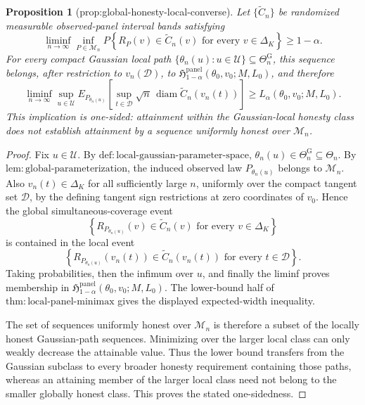 \documentclass{article}
\newtheorem{proposition}{Proposition}
\begin{document}
\begin{proposition}[prop:global-honesty-local-converse]\label{prop:global-honesty-local-converse}
Let \(\{\widetilde C_n\}\) be randomized measurable observed-panel interval bands satisfying
\[
\liminf_{n\to\infty}\inf_{P\in\mathcal M_n}
P\!\left\{
R_P(v)\in\widetilde C_n(v)
\text{ for every }v\in\Delta_K
\right\}
\ge1-\alpha.
\]
For every compact Gaussian local path
\(\{\theta_n(u):u\in\mathcal U\}\subseteq\Theta_n^{\mathrm G}\), this sequence belongs, after restriction to \(v_n(\mathcal D)\), to
\(\mathfrak H^{\mathrm{panel}}_{1-\alpha}(\theta_0,v_0;M,L_0)\), and therefore
\[
\liminf_{n\to\infty}\sup_{u\in\mathcal U}
E_{P_{\theta_n(u)}}\!\left[
\sup_{t\in\mathcal D}\sqrt n\,
\operatorname{diam}\widetilde C_n(v_n(t))
\right]
\ge L_\alpha(\theta_0,v_0;M,L_0).
\]
This implication is one-sided: attainment within the Gaussian-local honesty class does not establish attainment by a sequence uniformly honest over \(\mathcal M_n\).
\end{proposition}
\begin{proof}
Fix \(u\in\mathcal U\).  By
\(\mathrm{def:local\mbox{-}gaussian\mbox{-}parameter\mbox{-}space}\),
\(\theta_n(u)\in\Theta_n^{\mathrm G}\subseteq\Theta_n\).  By
\(\mathrm{lem:global\mbox{-}parameterization}\), the induced observed law
\(P_{\theta_n(u)}\) belongs to \(\mathcal M_n\).  Also
\(v_n(t)\in\Delta_K\) for all sufficiently large \(n\), uniformly over the compact tangent set \(\mathcal D\), by the defining tangent sign restrictions at zero coordinates of \(v_0\).  Hence the global simultaneous-coverage event
\[
\left\{
R_{P_{\theta_n(u)}}(v)
\in\widetilde C_n(v)
\text{ for every }v\in\Delta_K
\right\}
\]
is contained in the local event
\[
\left\{
R_{P_{\theta_n(u)}}(v_n(t))
\in\widetilde C_n(v_n(t))
\text{ for every }t\in\mathcal D
\right\}.
\]
Taking probabilities, then the infimum over \(u\), and finally the liminf proves membership in
\(\mathfrak H^{\mathrm{panel}}_{1-\alpha}(\theta_0,v_0;M,L_0)\).  The lower-bound half of
\(\mathrm{thm:local\mbox{-}panel\mbox{-}minimax}\) gives the displayed expected-width inequality.

The set of sequences uniformly honest over \(\mathcal M_n\) is therefore a subset of the locally honest Gaussian-path sequences.  Minimizing over the larger local class can only weakly decrease the attainable value.  Thus the lower bound transfers from the Gaussian subclass to every broader honesty requirement containing those paths, whereas an attaining member of the larger local class need not belong to the smaller globally honest class.  This proves the stated one-sidedness.
\end{proof}
\end{document}
